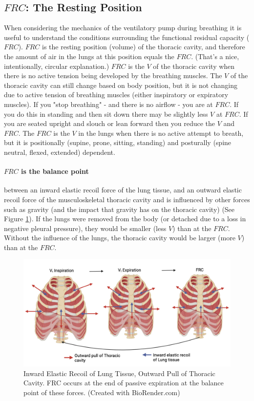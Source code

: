 \subsection{$FRC$: The Resting Position}

When considering the mechanics of the ventilatory pump during breathing it is useful to understand the conditions surrounding the functional residual capacity ($FRC$). $FRC$ is the resting position (volume) of the thoracic cavity, and therefore the amount of air in the lungs at this position equals the $FRC$. (That's a nice, intentionally, circular explanation.) 
$FRC$ is the $V$ of the thoracic cavity when there is no active tension being developed by the breathing muscles. The $V$ of the thoracic cavity can still change based on body position, but it is not changing due to active tension of breathing muscles (either inspiratory or expiratory muscles). If you "stop breathing" - and there is no airflow - you are at $FRC$. If you do this in standing and then sit down there may be slightly less $V$ at $FRC$. If you are seated upright and slouch or lean forward then you reduce the $V$ and $FRC$. The $FRC$ is the $V$ in the lungs when there is no active attempt to breath, but it is positionally (supine, prone, sitting, standing) and posturally (spine neutral, flexed, extended) dependent.

\paragraph{$FRC$ is the balance point} between an inward elastic recoil force of the lung tissue, and an outward elastic recoil force of the musculoskeletal thoracic cavity and is influenced by other forces such as gravity (and the impact that gravity has on the thoracic cavity) (See Figure \ref{fig:frc}). If the lungs were removed from the body (or detached due to a loss in negative pleural pressure), they would be smaller (less $V$) than at the $FRC$. Without the influence of the lungs, the thoracic cavity would be larger (more $V$) than at the $FRC$. 



\begin{figure}[!h]
    \centering
    \includegraphics[width = 1.0 \linewidth]{./figure/ventilation/frc.png}
    \caption{Inward Elastic Recoil of Lung Tissue, Outward Pull of Thoracic Cavity. FRC occurs at the end of passive expiration at the balance point of these forces. \footnotesize{(Created with BioRender.com)}  }
    \label{fig:frc}
\end{figure}

